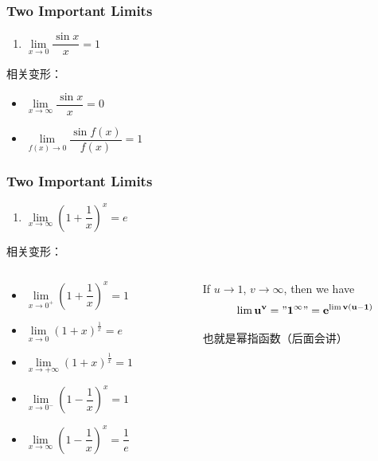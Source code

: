 \begin{frame}
	\frametitle{Two Important Limits}
	\begin{enumerate}
		\item $\lim\limits_{\textit{x} \to 0}\dfrac{\sin{x}}{x} = 1$\\
	\end{enumerate}

	\vspace*{\baselineskip} %

	相关变形：
	\begin{itemize}
		\item $\lim \limits_{x \to \infty} \dfrac{\sin x}{x} = 0$ \\
		\item $\lim \limits_{f(x) \to 0} \dfrac{\sin f(x)}{f(x)} = 1$ \\
	\end{itemize}
\end{frame}

\begin{frame}
	\frametitle{Two Important Limits}
	\begin{enumerate}
		\item $\lim\limits_{\textit{x} \to \infty}(1 + \dfrac{1}{x})^{x} = e$
	\end{enumerate}

	\vspace*{\baselineskip} %

	相关变形：
	\begin{columns}
		\begin{column}{0.5\textwidth}
			\begin{itemize}
				\item $\lim \limits_{x \to 0^{+}} (1+\dfrac{1}{x})^x = 1$ \\
				\item $\lim \limits_{x\to 0} (1+x)^{\frac{1}{x}} = e$ \\
				\item $\lim \limits_{x\to +\infty} (1+x)^{\frac{1}{x}} = 1$ \\
				\item $\lim \limits_{x\to 0^{-}} (1-\dfrac{1}{x})^x = 1$ \\
				\item $\lim \limits_{x\to \infty} (1-\dfrac{1}{x})^x = \dfrac{1}{e} $
			\end{itemize}
		\end{column}

		\begin{column}{0.5\textwidth}
			If $u \to 1$, $v\to \infty$, then we have
			\[
				\mathbf{\lim u^v = "1^\infty" = e^{\lim v(u-1)}}
			\]

			也就是幂指函数（后面会讲）
		\end{column}
	\end{columns}
\end{frame}


